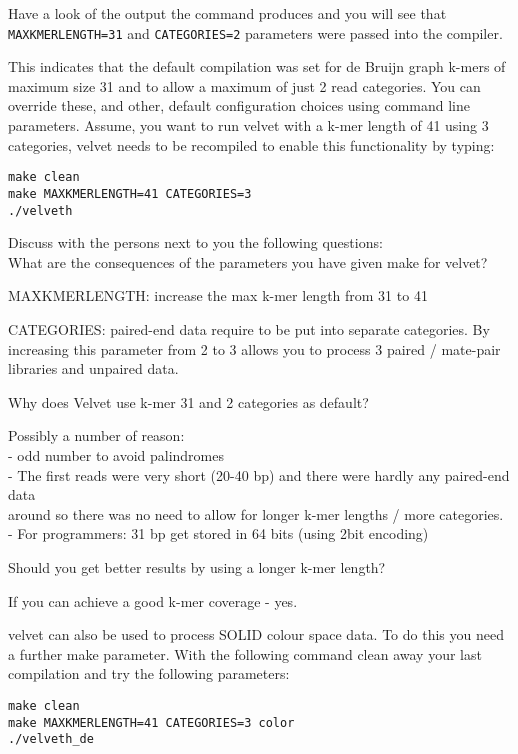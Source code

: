 \begin{steps}
Have a look of the output the command produces and you will see that
\texttt{MAXKMERLENGTH=31} and \texttt{CATEGORIES=2} parameters were passed into
the compiler.

This indicates that the default compilation was set for de Bruijn graph k-mers of
maximum size 31 and to allow a maximum of just 2 read categories. You can
override these, and other, default configuration choices using command line
parameters. Assume, you want to run velvet with a k-mer length of 41 using 3
categories, velvet needs to be recompiled to enable this functionality by
typing:
\begin{lstlisting}
make clean
make MAXKMERLENGTH=41 CATEGORIES=3
./velveth
\end{lstlisting}
\end{steps}

\begin{questions}
Discuss with the persons next to you the following questions:\\
What are the consequences of the parameters you have given make for velvet?
\begin{answer}
MAXKMERLENGTH: increase the max k-mer length from 31 to 41

CATEGORIES: paired-end data require to be put into separate categories. By
increasing this parameter from 2 to 3 allows you to process 3 paired / mate-pair
libraries and unpaired data.
\end{answer}

Why does Velvet use k-mer 31 and 2 categories as default?
\begin{answer}
Possibly a number of reason:\\
  - odd number to avoid palindromes\\
  - The first reads were very short (20-40 bp) and there were hardly any paired-end data\\
     around so there was no need to allow for longer k-mer lengths / more categories.\\
  - For programmers: 31 bp get stored in 64 bits (using 2bit encoding)
\end{answer}

Should you get better results by using a longer k-mer length?
\begin{answer}
If you can achieve a good k-mer coverage - yes.
\end{answer}
\end{questions}

\begin{bonus}
velvet can also be used to process SOLID colour space data. To do this you need
a further make parameter. With the following command clean away your last
compilation and try the following parameters:
\begin{lstlisting}
make clean
make MAXKMERLENGTH=41 CATEGORIES=3 color
./velveth_de
\end{lstlisting}
\end{bonus}

